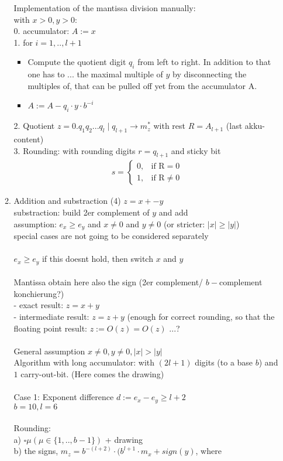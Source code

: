 \begin{itemize}
\begin{enumerate}
\begin{enumerate}
\begin{itemize}
\end{itemize}
\end{enumerate}
Implementation of the mantissa division manually: \\
with $x>0, y>0:$ \\
0. accumulator: $A:=x$ \\
1. for $i=1,..,l+1$
\begin{itemize}
	\item Compute the quotient digit $q_i$ from left to right. In addition to that one has to ... the maximal multiple of $y$ by disconnecting the multiples of, that can be pulled off yet from the accumulator A.
	\item $A:=A-q_i\cdot y\cdot b^{-i}$ 
\end{itemize}
2. Quotient $z=0.q_1q_2...q_l \mid q_{l+1} \to m_z^*$ with rest $R=A_{l+1}$ (last akku-content) \\
3. Rounding: with rounding digits $r=q_{l+1}$ and sticky bit \\
\begin{align*}
	s =
	\begin{cases}
		0, & \text{if R}=0\\
		1,  & \text{if R}\not= 0
	\end{cases}
\end{align*}

\item Addition and substraction (4) $z=x+-y$ \\
substraction: build 2er complement of $y$ and add\\
assumption: $e_x\ge e_y$ and $x\neq 0$ and $y\neq 0$ (or stricter: $|x|\ge |y|$) \\
special cases are not going to be considered separately \\
\\
$e_x\ge e_y$ if this doesnt hold, then switch $x$ and $y$ \\

\\
Mantissa obtain here also the sign (2er complement/ $b-$complement konchierung?) \\
- exact result: $z=x+y$\\
- intermediate result: $z=z+y$ (enough for correct rounding, so that the floating point result: $z:=O(z)=O(z)$ ...? \\
\\
General assumption $x\not=0, y\not=0, |x|>|y|$ \\
Algorithm with long accumulator: with $(2l+1)$ digits (to a base $b$) and $1$ carry-out-bit. (Here comes the drawing) \\
\\
Case 1: Exponent difference $d:=e_x-e_y\ge l+2$ \\
$b=10, l=6$ \\
\\
Rounding: \\
a) $\square\mu (\mu\in \{1,..,b-1\})$ + drawing \\
b) the signs, $m_z=b^{-(l+2)}\cdot (b^{l+1}\cdot m_x+sign(y)$, where 


\end{enumerate}
\end{itemize}
